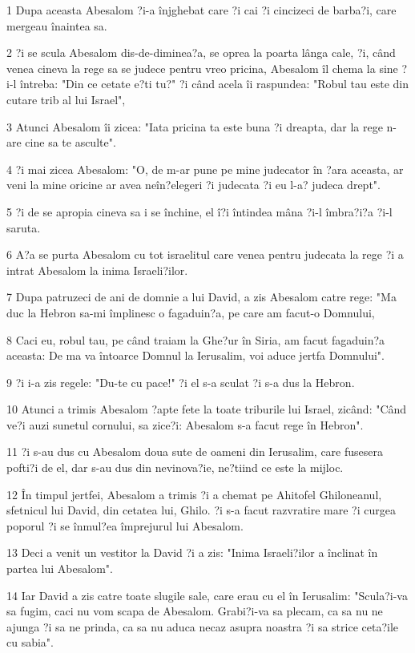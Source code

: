 \par 1 Dupa aceasta Abesalom ?i-a înjghebat care ?i cai ?i cincizeci de barba?i, care mergeau înaintea sa.
\par 2 ?i se scula Abesalom dis-de-diminea?a, se oprea la poarta lânga cale, ?i, când venea cineva la rege sa se judece pentru vreo pricina, Abesalom îl chema la sine ?i-l întreba: "Din ce cetate e?ti tu?" ?i când acela îi raspundea: "Robul tau este din cutare trib al lui Israel",
\par 3 Atunci Abesalom îi zicea: "Iata pricina ta este buna ?i dreapta, dar la rege n-are cine sa te asculte".
\par 4 ?i mai zicea Abesalom: "O, de m-ar pune pe mine judecator în ?ara aceasta, ar veni la mine oricine ar avea neîn?elegeri ?i judecata ?i eu l-a? judeca drept".
\par 5 ?i de se apropia cineva sa i se închine, el î?i întindea mâna ?i-l îmbra?i?a ?i-l saruta.
\par 6 A?a se purta Abesalom cu tot israelitul care venea pentru judecata la rege ?i a intrat Abesalom la inima Israeli?ilor.
\par 7 Dupa patruzeci de ani de domnie a lui David, a zis Abesalom catre rege: "Ma duc la Hebron sa-mi împlinesc o fagaduin?a, pe care am facut-o Domnului,
\par 8 Caci eu, robul tau, pe când traiam la Ghe?ur în Siria, am facut fagaduin?a aceasta: De ma va întoarce Domnul la Ierusalim, voi aduce jertfa Domnului".
\par 9 ?i i-a zis regele: "Du-te cu pace!" ?i el s-a sculat ?i s-a dus la Hebron.
\par 10 Atunci a trimis Abesalom ?apte fete la toate triburile lui Israel, zicând: "Când ve?i auzi sunetul cornului, sa zice?i: Abesalom s-a facut rege în Hebron".
\par 11 ?i s-au dus cu Abesalom doua sute de oameni din Ierusalim, care fusesera pofti?i de el, dar s-au dus din nevinova?ie, ne?tiind ce este la mijloc.
\par 12 În timpul jertfei, Abesalom a trimis ?i a chemat pe Ahitofel Ghiloneanul, sfetnicul lui David, din cetatea lui, Ghilo. ?i s-a facut razvratire mare ?i curgea poporul ?i se înmul?ea împrejurul lui Abesalom.
\par 13 Deci a venit un vestitor la David ?i a zis: "Inima Israeli?ilor a înclinat în partea lui Abesalom".
\par 14 Iar David a zis catre toate slugile sale, care erau cu el în Ierusalim: "Scula?i-va sa fugim, caci nu vom scapa de Abesalom. Grabi?i-va sa plecam, ca sa nu ne ajunga ?i sa ne prinda, ca sa nu aduca necaz asupra noastra ?i sa strice ceta?ile cu sabia".
